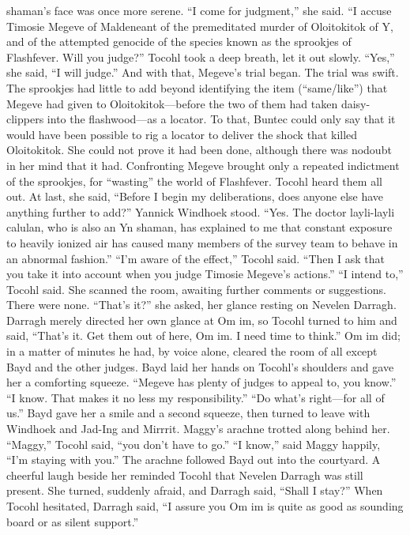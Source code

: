 \documentclass[9pt]{article}
\begin{document}
shaman’s face was once more serene. “I come for judgment,” she said. “I accuse Timosie Megeve of
Maldeneant of the premeditated murder of Oloitokitok of Y, and of the attempted genocide of the
species known as the sprookjes of Flashfever. Will you judge?”
Tocohl took a deep breath, let it out slowly. “Yes,” she said, “I will judge.” And with that, Megeve’s
trial began.
The trial was swift. The sprookjes had little to add beyond identifying the item (“same/like”) that
Megeve had given to Oloitokitok—before the two of them had taken daisy-clippers into the
flashwood—as a locator. To that, Buntec could only say that it would have been possible to rig a locator
to deliver the shock that killed Oloitokitok. She could not prove it had been done, although there was nodoubt in her mind that it had.
Confronting Megeve brought only a repeated indictment of the sprookjes, for “wasting” the world of
Flashfever.
Tocohl heard them all out. At last, she said, “Before I begin my deliberations, does anyone else have
anything further to add?”
Yannick Windhoek stood. “Yes. The doctor layli-layli calulan, who is also an Yn shaman, has
explained to me that constant exposure to heavily ionized air has caused many members of the survey
team to behave in an abnormal fashion.”
“I’m aware of the effect,” Tocohl said.
“Then I ask that you take it into account when you judge Timosie Megeve’s actions.”
“I intend to,” Tocohl said. She scanned the room, awaiting further comments or suggestions. There
were none. “That’s it?” she asked, her glance resting on Nevelen Darragh. Darragh merely directed her
own glance at Om im, so Tocohl turned to him and said, “That’s it. Get them out of here, Om im. I need
time to think.”
Om im did; in a matter of minutes he had, by voice alone, cleared the room of all except Bayd and
the other judges.
Bayd laid her hands on Tocohl’s shoulders and gave her a comforting squeeze. “Megeve has plenty
of judges to appeal to, you know.”
“I know. That makes it no less my responsibility.”
“Do what’s right—for all of us.” Bayd gave her a smile and a second squeeze, then turned to leave
with Windhoek and Jad-Ing and Mirrrit.
Maggy’s arachne trotted along behind her. “Maggy,” Tocohl said, “you don’t have to go.”
“I know,” said Maggy happily, “I’m staying with you.” The arachne followed Bayd out into the
courtyard.
A cheerful laugh beside her reminded Tocohl that Nevelen Darragh was still present. She turned,
suddenly afraid, and Darragh said, “Shall I stay?”
When Tocohl hesitated, Darragh said, “I assure you Om im is quite as good as sounding board or as
silent support.”
\end{document}
